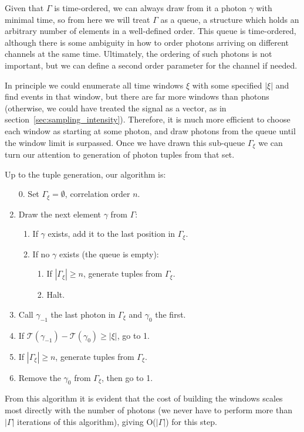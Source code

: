 \documentclass{article}
\newcommand{\abs}[1]{\ensuremath{\left|#1\right|}}
\newcommand{\Time}{\ensuremath{\mathcal{T}}}
\newcommand{\photon}{\ensuremath{\gamma}}
\newcommand{\photons}{\ensuremath{\Gamma}}
\newcommand{\timewindow}{\ensuremath{\xi}}
\begin{document}
Given that \photons{} is time-ordered, we can always draw from it a photon \photon{} with minimal time, so from here we will treat \photons{} as a queue, a structure which holds an arbitrary number of elements in a well-defined order. This queue is time-ordered, although there is some ambiguity in how to order photons arriving on different channels at the same time. Ultimately, the ordering of such photons is not important, but we can define a second order parameter for the channel if needed.

In principle we could enumerate all time windows \timewindow{} with some specified \abs{\timewindow} and find events in that window, but there are far more windows than photons (otherwise, we could have treated the signal as a vector, as in section~\ref{sec:sampling_intensity}). Therefore, it is much more efficient to choose each window as starting at some photon, and draw photons from the queue until the window limit is surpassed. Once we have drawn this sub-queue $\photons_{\timewindow}$ we can turn our attention to generation of photon tuples from that set.

Up to the tuple generation, our algorithm is:
\begin{enumerate}
\item[0.] Set $\photons_{\timewindow}=\emptyset$, correlation order $n$.
\item Draw the next element $\photon$ from $\photons$:
  \begin{enumerate}
  \item If $\photon$ exists, add it to the last position in $\photons_{\timewindow}$.
  \item If no $\photon$ exists (the queue is empty):
    \begin{enumerate}
    \item If $\abs{\photons_{\timewindow}}\ge n$, generate tuples from $\photons_{\timewindow}$.
    \item Halt.
    \end{enumerate}
  \end{enumerate}
\item Call $\photon_{-1}$ the last photon in $\photons_{\timewindow}$ and $\photon_{0}$ the first.
\item If $\Time(\photon_{-1})-\Time(\photon_{0})\ge\abs{\timewindow}$, go to 1.
\item If $\abs{\photons_{\timewindow}}\ge n$, generate tuples from $\photons_{\timewindow}$.
\item Remove the $\photon_{0}$ from $\photons_{\timewindow}$, then go to 1.
\end{enumerate}
From this algorithm it is evident that the cost of building the windows scales most directly with the number of photons (we never have to perform more than $\abs{\photons}$ iterations of this algorithm), giving O(\abs{\photons}) for this step. 
\end{document}
